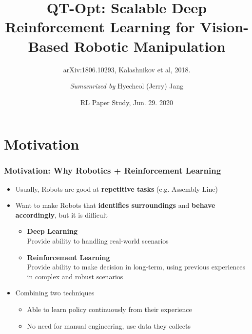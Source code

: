 \documentclass{beamer}
\title{QT-Opt: Scalable Deep Reinforcement Learning for Vision-Based Robotic Manipulation}
\subtitle{arXiv:1806.10293, Kalashnikov et al, 2018.}
\author{\textit{Sumamrized by} Hyecheol (Jerry) Jang}
\institute{
  Department of Computer Sciences\\
  University of Wisconsin–Madison
}
\date{RL Paper Study, Jun. 29. 2020}
\newcommand{\firstSec}{Motivation}
\begin{document}
  \frame{\titlepage}

  \section{\firstSec}
    \begin{frame}
      \frametitle{\firstSec : Why Robotics + Reinforcement Learning}
      \begin{itemize}
        \item Usually, Robots are good at \textbf{repetitive tasks} (e.g. Assembly Line)
        \item Want to make Robots that \textbf{identifies surroundings} and \textbf{behave accordingly},
              but it is difficult
        \begin{itemize}
          \item \textbf{Deep Learning}\\
                Provide ability to handling real-world scenarios
          \item \textbf{Reinforcement Learning}\\
                Provide ability to make decision in long-term,
                using previous experiences in complex and robust scenarios
        \end{itemize}
        \item Combining two techniques
        \begin{itemize}
          \item Able to learn policy continuously from their experience
          \item No need for manual engineering, use data they collects
        \end{itemize}
      \end{itemize}
    \end{frame}
\end{document}
